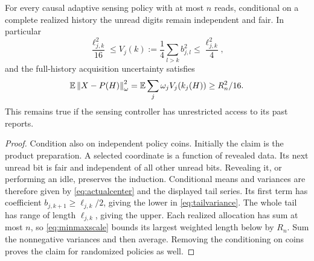 \begin{lemma}\label{lem:acquisition}
For every causal adaptive sensing policy with at most $n$ reads, conditional on a complete realized history the unread digits remain independent and fair. In particular
\begin{equation}\label{eq:tailvariance}
 \frac{\ell_{j,k}^2}{16}\le
 V_j(k):=\frac14\sum_{l>k}b_{j,l}^2
 \le\frac{\ell_{j,k}^2}{4},
\end{equation}
and the full-history acquisition uncertainty satisfies
\begin{equation}\label{eq:adaptivelower}
 \mathbb E\left\lVert X-P(H)\right\rVert_\omega^2
   =\mathbb E\sum_j\omega_j V_j(k_j(H))\ge R_n^2/16.
\end{equation}
This remains true if the sensing controller has unrestricted access to its past reports.
\end{lemma}
\begin{proof}
Condition also on independent policy coins. Initially the claim is the product preparation. A selected coordinate is a function of revealed data. Its next unread bit is fair and independent of all other unread bits. Revealing it, or performing an idle, preserves the induction. Conditional means and variances are therefore given by \eqref{eq:actualcenter} and the displayed tail series. Its first term has coefficient $b_{j,k+1}\ge\ell_{j,k}/2$, giving the lower in \eqref{eq:tailvariance}. The whole tail has range of length $\ell_{j,k}$, giving the upper. Each realized allocation has sum at most $n$, so \eqref{eq:minmaxscale} bounds its largest weighted length below by $R_n$. Sum the nonnegative variances and then average. Removing the conditioning on coins proves the claim for randomized policies as well.
\end{proof}

